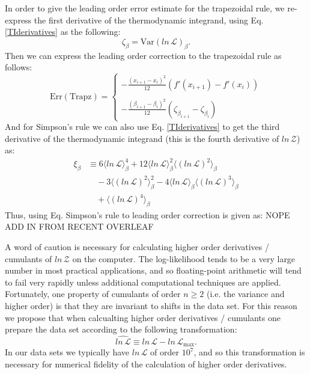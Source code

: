 In order to give the leading order error estimate for the trapezoidal rule, we re-express the first derivative of the thermodynamic integrand, using Eq. \ref{TIderivatives} as the following:
\begin{equation}\label{TrapzDeriv}
    \zeta_\beta = \mathrm{Var}\left(ln \, \mathcal{L}\right)_\beta.
\end{equation}
Then we can express the leading order correction to the trapezoidal rule as follows:
\begin{equation}\label{TrapzError}
    \mathrm{Err(Trapz)} = \left \{
              \begin{array}{ll}
              - \frac{\left(x_{i+1} - x_i\right)^2}{12} \left(f'(x_{i+1}) - f'(x_i)\right)   \\ \\
              -\frac{\left(\beta_{i+1} - \beta_i\right)^2}{12} \left(\zeta_{\beta_{i+1}}
               - \zeta_{\beta_{i}} \right)
              \end{array}
              \right.
\end{equation}
And for Simpson's rule we can also use Eq. \ref{TIderivatives} to get the third derivative of the thermodynamic integrand (this is the fourth derivative of $ln \, \mathcal{Z}$) as:
\begin{equation}\label{SimpsDeriv}
\begin{split}
    \xi_\beta & \equiv 6 \langle ln \, \mathcal{L} \rangle^4_\beta + 12 \langle ln \, \mathcal{L} \rangle^2_\beta \langle \left(ln \, \mathcal{L}\right)^2\rangle_\beta  \\
    &\quad - 3 \langle \left(ln \, \mathcal{L} \right)^2\rangle^2_\beta - 4 \langle ln \, \mathcal{L} \rangle_\beta \langle \left( ln \, \mathcal{L}\right)^3\rangle_\beta \\
    &\quad + \langle \left(ln \, \mathcal{L}\right)^4\rangle_\beta 
\end{split}
\end{equation}
Thus, using Eq. Simpson's rule to leading order correction is given as:
NOPE ADD IN FROM RECENT OVERLEAF

A word of caution is necessary for calculating higher order derivatives / cumulants of $ln \, \mathcal{Z}$ on the computer. The log-likelihood tends to be a very large number in most practical applications, and so floating-point arithmetic will tend to fail very rapidly unless additional computational techniques are applied. Fortunately, one property of cumulants of order $n \ge 2$ (i.e. the variance and higher order) is that they are invariant to shifts in the data set. For this reason we propose that when calcualting higher order derivatives / cumulants one prepare the data set according to the following transformation:
\begin{equation}\label{logltransform}
    \widehat{ln \, \mathcal{L}} \equiv ln \, \mathcal{L} - ln \, \mathcal{L}_\mathrm{max}.
\end{equation}
In our data sets we typically have $ln \, \mathcal{L}$ of order $10^7$, and so this transformation is necessary for numerical fidelity of the calculation of higher order derivatives.


